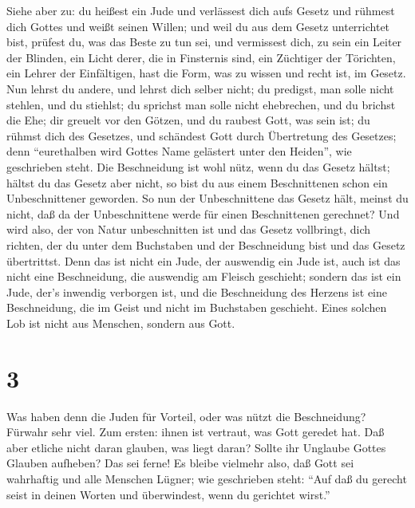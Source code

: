  Siehe aber zu: du heißest ein Jude und verlässest dich
aufs Gesetz und rühmest dich Gottes  und weißt seinen
Willen; und weil du aus dem Gesetz unterrichtet bist, prüfest du, was
das Beste zu tun sei,  und vermissest dich, zu sein ein
Leiter der Blinden, ein Licht derer, die in Finsternis sind,
 ein Züchtiger der Törichten, ein Lehrer der Einfältigen,
hast die Form, was zu wissen und recht ist, im Gesetz.  Nun
lehrst du andere, und lehrst dich selber nicht; du predigst, man solle
nicht stehlen, und du stiehlst;  du sprichst man solle
nicht ehebrechen, und du brichst die Ehe; dir greuelt vor den Götzen,
und du raubest Gott, was sein ist;  du rühmst dich des
Gesetzes, und schändest Gott durch Übertretung des Gesetzes;
 denn ``eurethalben wird Gottes Name gelästert unter den
Heiden'', wie geschrieben steht.  Die Beschneidung ist wohl
nütz, wenn du das Gesetz hältst; hältst du das Gesetz aber nicht, so
bist du aus einem Beschnittenen schon ein Unbeschnittener geworden.
 So nun der Unbeschnittene das Gesetz hält, meinst du
nicht, daß da der Unbeschnittene werde für einen Beschnittenen
gerechnet?  Und wird also, der von Natur unbeschnitten ist
und das Gesetz vollbringt, dich richten, der du unter dem Buchstaben und
der Beschneidung bist und das Gesetz übertrittst.  Denn das
ist nicht ein Jude, der auswendig ein Jude ist, auch ist das nicht eine
Beschneidung, die auswendig am Fleisch geschieht;  sondern
das ist ein Jude, der's inwendig verborgen ist, und die Beschneidung des
Herzens ist eine Beschneidung, die im Geist und nicht im Buchstaben
geschieht. Eines solchen Lob ist nicht aus Menschen, sondern aus Gott.

\hypertarget{section-2}{%
\section{3}\label{section-2}}

 Was haben denn die Juden für Vorteil, oder was nützt die
Beschneidung?  Fürwahr sehr viel. Zum ersten: ihnen ist
vertraut, was Gott geredet hat.  Daß aber etliche nicht
daran glauben, was liegt daran? Sollte ihr Unglaube Gottes Glauben
aufheben?  Das sei ferne! Es bleibe vielmehr also, daß Gott
sei wahrhaftig und alle Menschen Lügner; wie geschrieben steht: ``Auf
daß du gerecht seist in deinen Worten und überwindest, wenn du gerichtet
wirst.''

